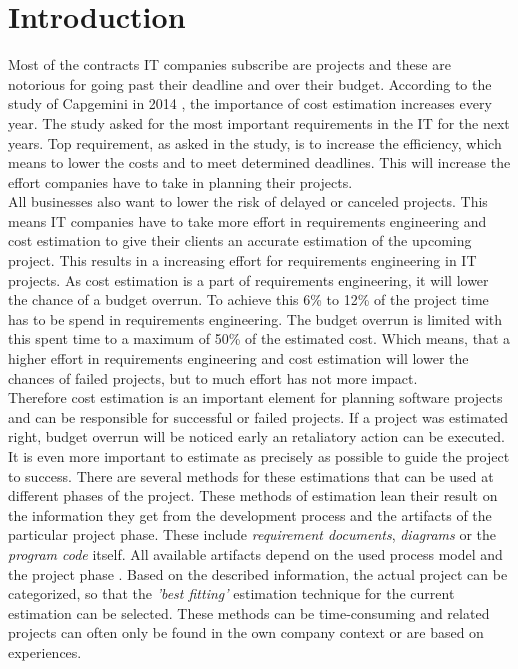 \chapter{Introduction}

Most of the contracts IT companies subscribe are projects and these are notorious for going past their deadline and over their budget. According to the study of Capgemini in 2014 \cite{capgemini}, the importance of cost estimation increases every year. The study asked for the most important requirements in the IT for the next years. Top requirement, as asked in the study, is to increase the efficiency, which means to lower the costs and to meet determined deadlines. This will increase the effort companies have to take in planning their projects.\\
All businesses also want to lower the risk of delayed or canceled projects. This means IT companies have to take more effort in requirements engineering and cost estimation to give their clients an accurate estimation of the upcoming project. This results in a increasing effort for requirements engineering in IT projects. As cost estimation is a part of requirements engineering, it will lower the chance of a budget overrun. To achieve this 6\% to 12\% of the project time has to be spend in requirements engineering. The budget overrun is limited with this spent time to a maximum of 50\% of the estimated cost\cite{Partsch}. Which means, that a higher effort in requirements engineering and cost estimation will lower the chances of failed projects, but to much effort has not more impact.\\
Therefore cost estimation is an important element for planning software projects and can be responsible for successful or failed projects. If a project was estimated right, budget overrun will be noticed early an retaliatory action can be executed. It is even more important to estimate as precisely as possible to guide the project to success. There are several methods for these estimations that can be used at different phases of the project. These methods of estimation lean their result on the information they get from the development process and the artifacts of the particular project phase. These include \textit{requirement documents}, \textit{diagrams} or the \textit{program code} itself. All available artifacts depend on the used process model and the project phase \cite{EntwicklungKompakt}. Based on the described information, the actual project can be categorized, so that the \textit{'best fitting'} estimation technique for the current estimation can be selected. These methods can be time-consuming and related projects can often only be found in the own company context or are based on experiences.\\
